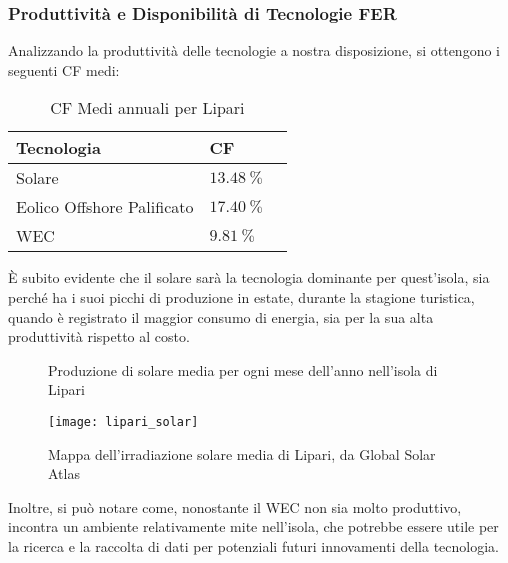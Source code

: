 \documentclass[fleqn,11pt]{SelfArx} %
\begin{document}
\subsubsection{Produttività e Disponibilità di Tecnologie FER}
Analizzando la produttività delle tecnologie a nostra disposizione, si ottengono i seguenti CF medi:

\begin{table}[H]
	\caption{CF Medi annuali per Lipari}
	\centering
	\begin{tabular}{llc}
		\toprule
		Tecnologia   & CF \\
		\midrule
		Solare       & \(\SI{13.48}{\percent}\)         \\
		Eolico Offshore Palificato & \(\SI{17.40}{\percent}\)          \\
		WEC          & \(\SI{9.81}{\percent}\)         \\
		\bottomrule
	\end{tabular}
	\label{tab:lipari_cf}
\end{table}

È subito evidente che il solare sarà la tecnologia dominante per quest'isola, sia perché ha i suoi picchi di produzione in estate, durante la stagione turistica, quando è registrato il maggior consumo di energia, sia per la sua alta produttività rispetto al costo.

\begin{figure}[H]\centering
	\caption{Produzione di solare media per ogni mese dell'anno nell'isola di Lipari}
	\label{fig:monthly_solar_lipari}
\end{figure}


\begin{figure}[ht]\centering
	\texttt{[image: lipari\_solar]}
	\caption{Mappa dell'irradiazione solare media di Lipari, da Global Solar Atlas}
	\label{fig:lipari_solar}
\end{figure}

Inoltre, si può notare come, nonostante il WEC non sia molto produttivo, incontra un ambiente relativamente mite nell'isola, che potrebbe essere utile per la ricerca e la raccolta di dati per potenziali futuri innovamenti della tecnologia.
\end{document}
